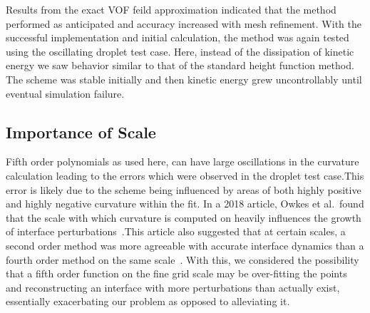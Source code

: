 Results from the exact VOF feild approximation indicated that the method performed as anticipated and accuracy increased with mesh refinement. With the successful implementation and initial calculation, the method was again tested using the oscillating droplet test case. Here, instead of the dissipation of kinetic energy we saw behavior similar to that of the standard height function method. The scheme was stable initially and then kinetic energy grew uncontrollably until eventual simulation failure.

\subsection{Importance of Scale}
 Fifth order polynomials as used here, can have large oscillations in the curvature calculation leading to the errors which were observed in the droplet test case.This error is likely due to the scheme being influenced by areas of both highly positive and highly negative curvature within the fit. In a 2018 article, Owkes et al.~found that the scale with which curvature is computed on heavily influences the growth of interface perturbations~\cite{Owkes2018}.This article also suggested that at certain scales, a second order method was more agreeable with accurate interface dynamics than a fourth order method on the same scale~\cite{Owkes2018}. With this, we considered the possibility that a fifth order function on the fine grid scale may be over-fitting the points and reconstructing an interface with more perturbations than actually exist, essentially exacerbating our problem as opposed to alleviating it. 

